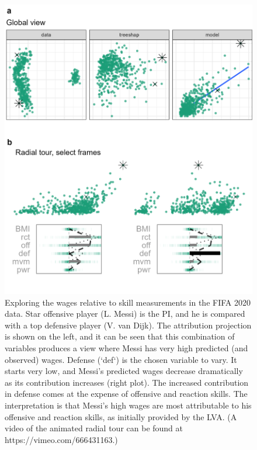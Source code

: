 \documentclass[
]{jss}
\begin{document}
\begin{CodeChunk}
\begin{figure}

{\centering \includegraphics[width=0.9\linewidth]{./figures/case_fifa} 

}

\caption[Exploring the wages relative to skill measurements in the FIFA 2020 data]{Exploring the wages relative to skill measurements in the FIFA 2020 data. Star offensive player (L. Messi) is the PI, and he is compared with a top defensive player (V. van Dijk). The attribution projection is shown on the left, and it can be seen that this combination of variables produces a view where Messi has very high predicted (and observed) wages. Defense (`def`) is the chosen variable to vary. It starts very low, and Messi's predicted wages decrease dramatically as its contribution increases (right plot). The increased contribution in defense comes at the expense of offensive and reaction skills. The interpretation is that Messi's high wages are most attributable to his offensive and reaction skills, as initially provided by the LVA. (A video of the animated radial tour can be found at https://vimeo.com/666431163.)}\label{fig:casefifa}
\end{figure}
\end{CodeChunk}
\end{document}
